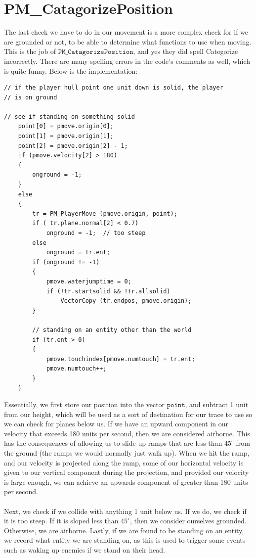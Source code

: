 \documentclass{article}
\begin{document}
\section{PM\_CatagorizePosition}
The last check we have to do in our movement is a more complex check for if we are grounded or not, to be able to determine what functions to use when moving. This is the job of $\texttt{PM\_CatagorizePosition}$, and yes they did spell Categorize incorrectly. There are many spelling errors in the code's comments as well, which is quite funny. Below is the implementation:
\begin{verbatim}
// if the player hull point one unit down is solid, the player
// is on ground

// see if standing on something solid	
	point[0] = pmove.origin[0];
	point[1] = pmove.origin[1];
	point[2] = pmove.origin[2] - 1;
	if (pmove.velocity[2] > 180)
	{
		onground = -1;
	}
	else
	{
		tr = PM_PlayerMove (pmove.origin, point);
		if ( tr.plane.normal[2] < 0.7)
			onground = -1;	// too steep
		else
			onground = tr.ent;
		if (onground != -1)
		{
			pmove.waterjumptime = 0;
			if (!tr.startsolid && !tr.allsolid)
				VectorCopy (tr.endpos, pmove.origin);
		}

		// standing on an entity other than the world
		if (tr.ent > 0)
		{
			pmove.touchindex[pmove.numtouch] = tr.ent;
			pmove.numtouch++;
		}
	}
\end{verbatim}
Essentially, we first store our position into the vector $\texttt{point}$, and subtract 1 unit from our height, which will be used as a sort of destination for our trace to use so we can check for planes below us. If we have an upward component in our velocity that exceeds 180 units per second, then we are considered airborne. This has the consequences of allowing us to slide up ramps that are less than $45^{\circ}$ from the ground (the ramps we would normally just walk up). When we hit the ramp, and our velocity is projected along the ramp, some of our horizontal velocity is given to our vertical component during the projection, and provided our velocity is large enough, we can achieve an upwards component of greater than 180 units per second. \\
\\
Next, we check if we collide with anything 1 unit below us. If we do, we check if it is too steep. If it is sloped less than $45^{\circ}$, then we consider ourselves grounded. Otherwise, we are airborne. Lastly, if we are found to be standing on an entity, we record what entity we are standing on, as this is used to trigger some events such as waking up enemies if we stand on their head.
\end{document}
